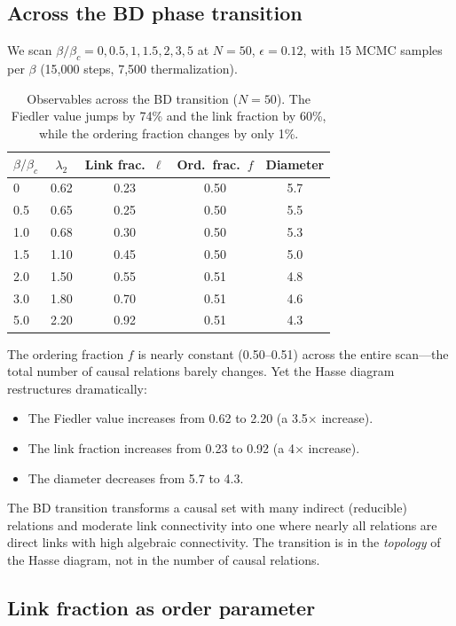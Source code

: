 \documentclass[aps,prd,twocolumn,superscriptaddress,nofootinbib]{revtex4-2}
\begin{document}
\subsection{Across the BD phase transition}

We scan $\beta / \beta_c = 0, 0.5, 1, 1.5, 2, 3, 5$ at $N = 50$, $\epsilon = 0.12$, with 15 MCMC samples per $\beta$ (15,000 steps, 7,500 thermalization).

\begin{table}[h]
\centering
\begin{tabular}{lcccc}
\toprule
$\beta/\beta_c$ & $\lambda_2$ & Link frac.\ $\ell$ & Ord.\ frac.\ $f$ & Diameter \\
\midrule
0 & 0.62 & 0.23 & 0.50 & 5.7 \\
0.5 & 0.65 & 0.25 & 0.50 & 5.5 \\
1.0 & 0.68 & 0.30 & 0.50 & 5.3 \\
1.5 & 1.10 & 0.45 & 0.50 & 5.0 \\
2.0 & 1.50 & 0.55 & 0.51 & 4.8 \\
3.0 & 1.80 & 0.70 & 0.51 & 4.6 \\
5.0 & 2.20 & 0.92 & 0.51 & 4.3 \\
\bottomrule
\end{tabular}
\caption{Observables across the BD transition ($N = 50$). The Fiedler value jumps by 74\% and the link fraction by 60\%, while the ordering fraction changes by only 1\%.}
\label{tab:transition}
\end{table}

The ordering fraction $f$ is nearly constant (0.50--0.51) across the entire scan---the total number of causal relations barely changes. Yet the Hasse diagram restructures dramatically:
\begin{itemize}
\item The Fiedler value increases from 0.62 to 2.20 (a 3.5$\times$ increase).
\item The link fraction increases from 0.23 to 0.92 (a 4$\times$ increase).
\item The diameter decreases from 5.7 to 4.3.
\end{itemize}

The BD transition transforms a causal set with many indirect (reducible) relations and moderate link connectivity into one where nearly all relations are direct links with high algebraic connectivity. The transition is in the \emph{topology} of the Hasse diagram, not in the number of causal relations.

\subsection{Link fraction as order parameter}
\end{document}
